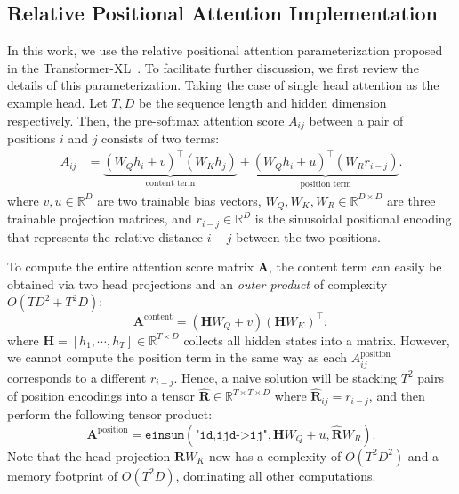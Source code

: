 \documentclass{article}
\theoremstyle{custom}
\newcommand{\mb}[1]{\boldsymbol{\mathbf{#1}}}
\newcommand{\mbb}[1]{\mathbb{#1}}
\newcommand{\seq}[1]{\left[ {#1} \right]}
\newcommand{\R}{\mbb{R}}
\begin{document}
\subsection{Relative Positional Attention Implementation}
\label{sec:appendix-rel-attention}
In this work, we use the relative positional attention parameterization proposed in the Transformer-XL~\cite{dai2019transformer}.
To facilitate further discussion, we first review the details of this parameterization.
Taking the case of single head attention as the example head. 
Let $T, D$ be the sequence length and hidden dimension respectively.
Then, the pre-softmax attention score $A_{ij}$ between a pair of positions $i$ and $j$ consists of two terms:
\begin{align}
\label{eqn:rel_attn}
A_{ij} &= 
	\underbrace{ (W_Q h_i + v)^\top (W_K h_j) }_\text{ content term } + \underbrace{ (W_Q h_i + u)^\top (W_R r_{i-j}) }_\text{ position term }.
\end{align}
where $v, u \in \R^{D}$ are two trainable bias vectors, $W_Q, W_K, W_R \in \R^{D \times D}$ are three trainable projection matrices, and $r_{i-j} \in \R^{D}$ is the sinusoidal positional encoding that represents the relative distance $i-j$ between the two positions.

To compute the entire attention score matrix $\mb{A}$, the content term can easily be obtained via two head projections and an \textit{outer product} of complexity $O(TD^2 + T^2D)$:
\[ 
	\mb{A}^\text{content} = (\mb{H}W_Q + v) (\mb{H}W_K)^\top,
\]
where $\mb{H} = \seq{h_1, \cdots, h_T} \in \R^{T \times D}$ collects all hidden states into a matrix.
However, we cannot compute the position term in the same way as each $A_{ij}^\text{position}$ corresponds to a different $r_{i-j}$. 
Hence, a naive solution will be stacking $T^2$ pairs of position encodings into a tensor $\mb{\hat{R}} \in \R^{T\times T\times D}$ where $\mb{\hat{R}}_{ij} = r_{i-j}$, and then perform the following tensor product:
\[
	\mb{A}^\text{position} = \texttt{einsum}(\texttt{"id,ijd->ij"}, \mb{H}W_Q + u, \hat{\mb{R}}W_R).
\]
Note that the head projection $\mb{R}W_K$ now has a complexity of $O(T^2D^2)$ and a memory footprint of $O(T^2D)$, dominating all other computations.
\end{document}
